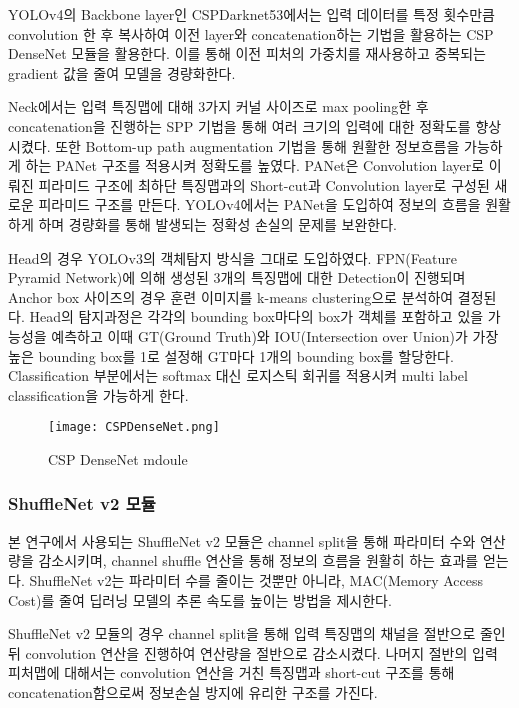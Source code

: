\documentclass[10pt,twocolumn,letterpaper]{article}
\begin{document}
YOLOv4의 Backbone layer인 CSPDarknet53에서는 입력 데이터를 특정 횟수만큼 convolution 한 후 복사하여 이전 layer와 concatenation하는 기법을 활용하는 CSP DenseNet \cite{wang2020cspnet} 모듈을 활용한다. 이를 통해 이전 피처의 가중치를 재사용하고 중복되는 gradient 값을 줄여 모델을 경량화한다.

Neck에서는 입력 특징맵에 대해 3가지 커널 사이즈로 max pooling한 후 concatenation을 진행하는 SPP \cite{he2015spatial} 기법을 통해 여러 크기의 입력에 대한 정확도를 향상시켰다. 또한 Bottom-up path augmentation 기법을 통해 원활한 정보흐름을 가능하게 하는 PANet \cite{liu2018path} 구조를 적용시켜 정확도를 높였다. PANet은 Convolution layer로 이뤄진 피라미드 구조에 최하단 특징맵과의 Short-cut과 Convolution layer로 구성된 새로운 피라미드 구조를 만든다. YOLOv4에서는 PANet을 도입하여 정보의 흐름을 원활하게 하며 경량화를 통해 발생되는 정확성 손실의 문제를 보완한다.

Head의 경우 YOLOv3의 객체탐지 방식을 그대로 도입하였다. FPN(Feature Pyramid Network)에 의해 생성된 3개의 특징맵에 대한 Detection이 진행되며 Anchor box 사이즈의 경우 훈련 이미지를 k-means clustering으로 분석하여 결정된다. Head의 탐지과정은 각각의 bounding box마다의 box가 객체를 포함하고 있을 가능성을 예측하고 이때 GT(Ground Truth)와 IOU(Intersection over Union)가 가장 높은 bounding box를 1로 설정해 GT마다 1개의 bounding box를 할당한다. Classification 부분에서는 softmax 대신 로지스틱 회귀를 적용시켜 multi label classification을 가능하게 한다.


\begin{figure}[t]
    \captionsetup{singlelinecheck = false, format= hang, justification=raggedright, labelsep=space}
    \centering
        \texttt{[image: CSPDenseNet.png]}
    \caption{CSP DenseNet mdoule}
    \label{CSPDenseNet}
\end{figure}


\vspace{.15cm}
\subsubsection{ShuffleNet v2 모듈}
본 연구에서 사용되는 ShuffleNet v2 \cite{ma2018shufflenet} 모듈은 channel split을 통해 파라미터 수와 연산량을 감소시키며, channel shuffle 연산을 통해 정보의 흐름을 원활히 하는 효과를 얻는다. ShuffleNet v2는 파라미터 수를 줄이는 것뿐만 아니라, MAC(Memory Access Cost)를 줄여 딥러닝 모델의 추론 속도를 높이는 방법을 제시한다.

ShuffleNet v2 모듈의 경우 channel split을 통해 입력 특징맵의 채널을 절반으로 줄인 뒤 convolution 연산을 진행하여 연산량을 절반으로 감소시켰다. 나머지 절반의 입력 피처맵에 대해서는 convolution 연산을 거친 특징맵과 short-cut 구조를 통해 concatenation함으로써 정보손실 방지에 유리한 구조를 가진다.
\end{document}
